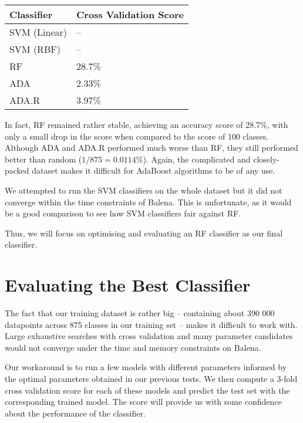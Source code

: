 \vspace{15pt}
\parbox{\linewidth} {
	\centering
  \begin{tabular}{|m{}|M{0.35\textwidth}|}
		\hline 
    \textbf{Classifier} & 
    \textbf{Cross Validation Score} 
		\\ \hline 
    SVM (Linear) & --
		\\ \hline
    SVM (RBF)    & --
		\\ \hline
    RF           & 28.7\%
		\\ \hline
    ADA          & 2.33\%
		\\ \hline
    ADA.R        & 3.97\%
		\\ \hline
	\end{tabular}
\label{tab:unop_score}
}
\vspace{15pt}

In fact, RF remained rather stable, achieving an accuracy score of 28.7\%, with only a small drop in the score when compared to the score of 100 classes. Although ADA and ADA.R performed much worse than RF, they still performed better than random ($1/875 = 0.0114\%$). Again, the complicated and closely-packed dataset makes it difficult for AdaBoost algorithms to be of any use. 

We attempted to run the SVM classifiers on the whole dataset but it did not converge within the time constraints of Balena. This is unfortunate, as it would be a good comparison to see how SVM classifiers fair against RF.

Thus, we will focus on optimising and evaluating an RF classifier as our final classifier.

\section{Evaluating the Best Classifier} \label{sec:res-eval}
The fact that our training dataset is rather big -- containing about 390 000 datapoints across 875 classes in our training set -- makes it difficult to work with. Large exhaustive searches with cross validation and many parameter candidates would not converge under the time and memory constraints on Balena.

Our workaround is to run a few models with different parameters informed by the optimal parameters obtained in our previous tests. We then compute a 3-fold cross validation score for each of these models and predict the test set with the corresponding trained model. The score will provide us with some confidence about the performance of the classifier. 

